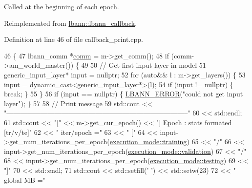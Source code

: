 Called at the beginning of each epoch. 

Reimplemented from \hyperlink{classlbann_1_1lbann__callback_a4ed9498763412a55953fff71ee3a9456}{lbann\+::lbann\+\_\+callback}.



Definition at line 46 of file callback\+\_\+print.\+cpp.


\begin{DoxyCode}
46                                                   \{
47   lbann\_comm *\hyperlink{file__io_8cpp_ab048c6f9fcbcfaa57ce68b00263dbebe}{comm} = m->get\_comm();
48   \textcolor{keywordflow}{if} (comm->am\_world\_master()) \{
49 
50     \textcolor{comment}{// Get first input layer in model}
51     generic\_input\_layer* input = \textcolor{keyword}{nullptr};
52     \textcolor{keywordflow}{for} (\textcolor{keyword}{auto}&& l : m->get\_layers()) \{
53       input = \textcolor{keyword}{dynamic\_cast<}generic\_input\_layer*\textcolor{keyword}{>}(l);
54       \textcolor{keywordflow}{if} (input != \textcolor{keyword}{nullptr}) \{ \textcolor{keywordflow}{break}; \}
55     \}
56     \textcolor{keywordflow}{if} (input == \textcolor{keyword}{nullptr}) \{ \hyperlink{base_8hpp_a80b1d707117e968a6951b7222e4b2b87}{LBANN\_ERROR}(\textcolor{stringliteral}{"could not get input layer"}); \}
57 
58     \textcolor{comment}{// Print message}
59     std::cout << \textcolor{stringliteral}{"--------------------------------------------------------------------------------"}
60               << std::endl;
61     std::cout << \textcolor{stringliteral}{"["} << m->get\_cur\_epoch() << \textcolor{stringliteral}{"] Epoch : stats formated [tr/v/te]"}
62               << \textcolor{stringliteral}{" iter/epoch ="}
63               << \textcolor{stringliteral}{" ["}
64               << input->get\_num\_iterations\_per\_epoch(\hyperlink{base_8hpp_a2781a159088df64ed7d47cc91c4dc0a8ac185ddac8b5a8f5aa23c5b80bc12d214}{execution\_mode::training})
65               << \textcolor{stringliteral}{"/"}
66               << input->get\_num\_iterations\_per\_epoch(\hyperlink{base_8hpp_a2781a159088df64ed7d47cc91c4dc0a8aa617908b172c473cb8e8cda059e55bf0}{execution\_mode::validation})
67               << \textcolor{stringliteral}{"/"}
68               << input->get\_num\_iterations\_per\_epoch(\hyperlink{base_8hpp_a2781a159088df64ed7d47cc91c4dc0a8aae2b1fca515949e5d54fb22b8ed95575}{execution\_mode::testing})
69               << \textcolor{stringliteral}{"]"}
70               << std::endl;
71     std::cout << std::setfill(\textcolor{charliteral}{' '}) << std::setw(23)
72               << \textcolor{stringliteral}{" global MB ="}

\end{DoxyCode}
